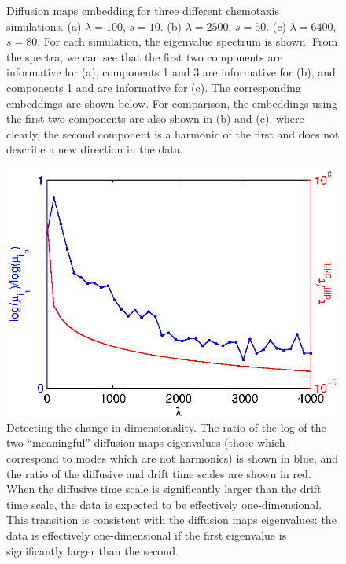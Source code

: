 \documentclass[preprint]{elsarticle}
\begin{document}
\begin{figure}
\begin{subfigure}[t]{0.35\textwidth}
\caption{}
\end{subfigure}
%
\caption{Diffusion maps embedding for three different chemotaxis simulations. (a) $\lambda = 100$, $s = 10$. (b) $\lambda = 2500$, $s = 50$. (c) $\lambda = 6400$, $s = 80$. For each simulation, the eigenvalue spectrum is shown. From the spectra, we can see that the first two components are informative for (a), components 1 and 3 are informative for (b), and components 1 and  are informative for (c). The corresponding embeddings are shown below. For comparison, the embeddings using the first two components are also shown in (b) and (c), where clearly, the second component is a harmonic of the first and does not describe a new direction in the data. }
%
\end{figure}

\begin{figure}[t]
%
\centering
\includegraphics[width=\textwidth]{chemotaxis_compare_timescales_evals}
%
\caption{Detecting the change in dimensionality. The ratio of the log of the two ``meaningful'' diffusion maps eigenvalues (those which correspond to modes which are not harmonics) is shown in blue, and the ratio of the diffusive and drift time scales are shown in red. When the diffusive time scale is significantly larger than the drift time scale, the data is expected to be effectively one-dimensional. This transition is consistent with the diffusion maps eigenvalues: the data is effectively one-dimensional if the first eigenvalue is significantly larger than the second. }
%
\label{fig:chemotaxis_compare_timescales_evals}
%
\end{figure}
\end{document}
